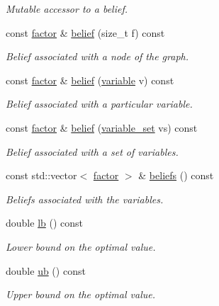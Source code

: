 \begin{DoxyCompactItemize}
\begin{DoxyCompactList}\small\item\em Mutable accessor to a belief. \end{DoxyCompactList}\item 
const \hyperlink{classmerlin_1_1factor}{factor} \& \hyperlink{classmerlin_1_1lbp_a1df7d0dc71990b595c1a169498a2e087}{belief} (size\+\_\+t f) const 
\begin{DoxyCompactList}\small\item\em Belief associated with a node of the graph. \end{DoxyCompactList}\item 
const \hyperlink{classmerlin_1_1factor}{factor} \& \hyperlink{classmerlin_1_1lbp_af34aa24b4de8a0ae9f579ba6d83ee0bf}{belief} (\hyperlink{classmerlin_1_1variable}{variable} v) const 
\begin{DoxyCompactList}\small\item\em Belief associated with a particular variable. \end{DoxyCompactList}\item 
const \hyperlink{classmerlin_1_1factor}{factor} \& \hyperlink{classmerlin_1_1lbp_a37223c0f6db663160062bed87d2ac803}{belief} (\hyperlink{classmerlin_1_1variable__set}{variable\+\_\+set} vs) const 
\begin{DoxyCompactList}\small\item\em Belief associated with a set of variables. \end{DoxyCompactList}\item 
const std\+::vector$<$ \hyperlink{classmerlin_1_1factor}{factor} $>$ \& \hyperlink{classmerlin_1_1lbp_adccd484965707ae36ffc7f1d49b58ac9}{beliefs} () const 
\begin{DoxyCompactList}\small\item\em Beliefs associated with the variables. \end{DoxyCompactList}\item 
double \hyperlink{classmerlin_1_1lbp_af7cec119584c4ca671a82e23ac5098f1}{lb} () const 
\begin{DoxyCompactList}\small\item\em Lower bound on the optimal value. \end{DoxyCompactList}\item 
double \hyperlink{classmerlin_1_1lbp_a6f47094c1dd1b721c8b55b2a104bf708}{ub} () const 
\begin{DoxyCompactList}\small\item\em Upper bound on the optimal value. \end{DoxyCompactList}\item 

\end{DoxyCompactItemize}
